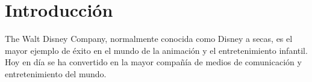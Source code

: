 \section{Introducción}
The Walt Disney Company, normalmente conocida como Disney a secas, es el mayor ejemplo de éxito en el mundo de la animación y el entretenimiento infantil. Hoy en día se ha convertido en la mayor compañía de medios de comunicación y entretenimiento del mundo.

